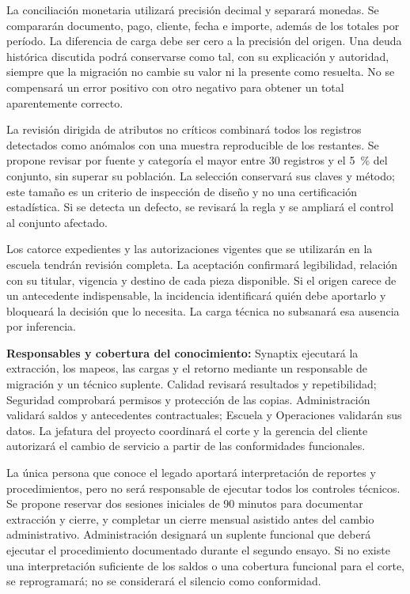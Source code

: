 La conciliación monetaria utilizará precisión decimal y separará monedas. Se compararán documento, pago, cliente, fecha e importe, además de los totales por período. La diferencia de carga debe ser cero a la precisión del origen. Una deuda histórica discutida podrá conservarse como tal, con su explicación y autoridad, siempre que la migración no cambie su valor ni la presente como resuelta. No se compensará un error positivo con otro negativo para obtener un total aparentemente correcto.

La revisión dirigida de atributos no críticos combinará todos los registros detectados como anómalos con una muestra reproducible de los restantes. Se propone revisar por fuente y categoría el mayor entre 30 registros y el 5~\% del conjunto, sin superar su población. La selección conservará sus claves y método; este tamaño es un criterio de inspección de diseño y no una certificación estadística. Si se detecta un defecto, se revisará la regla y se ampliará el control al conjunto afectado.

Los catorce expedientes y las autorizaciones vigentes que se utilizarán en la escuela tendrán revisión completa. La aceptación confirmará legibilidad, relación con su titular, vigencia y destino de cada pieza disponible. Si el origen carece de un antecedente indispensable, la incidencia identificará quién debe aportarlo y bloqueará la decisión que lo necesita. La carga técnica no subsanará esa ausencia por inferencia.

\textbf{Responsables y cobertura del conocimiento:} Synaptix ejecutará la extracción, los mapeos, las cargas y el retorno mediante un responsable de migración y un técnico suplente. Calidad revisará resultados y repetibilidad; Seguridad comprobará permisos y protección de las copias. Administración validará saldos y antecedentes contractuales; Escuela y Operaciones validarán sus datos. La jefatura del proyecto coordinará el corte y la gerencia del cliente autorizará el cambio de servicio a partir de las conformidades funcionales.

La única persona que conoce el legado aportará interpretación de reportes y procedimientos, pero no será responsable de ejecutar todos los controles técnicos. Se propone reservar dos sesiones iniciales de 90 minutos para documentar extracción y cierre, y completar un cierre mensual asistido antes del cambio administrativo. Administración designará un suplente funcional que deberá ejecutar el procedimiento documentado durante el segundo ensayo. Si no existe una interpretación suficiente de los saldos o una cobertura funcional para el corte, se reprogramará; no se considerará el silencio como conformidad.

